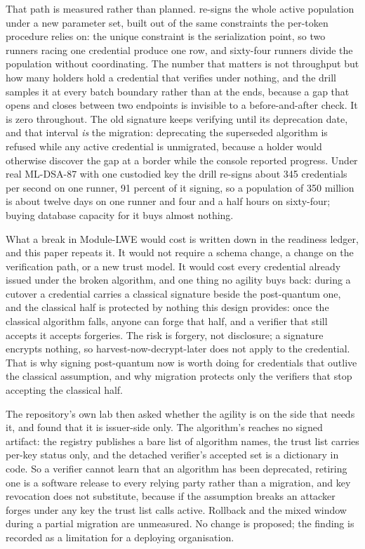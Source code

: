 That path is measured rather than planned.  re-signs the whole
active population under a new parameter set, built out of the same constraints the per-token
procedure relies on: the unique constraint is the serialization point, so two runners racing one
credential produce one row, and sixty-four runners divide the population without coordinating. The
number that matters is not throughput but how many holders hold a credential that verifies under
nothing, and the drill samples it at every batch boundary rather than at the ends, because a gap
that opens and closes between two endpoints is invisible to a before-and-after check. It is zero
throughout. The old signature keeps verifying until its deprecation date, and that interval
\emph{is} the migration: deprecating the superseded algorithm is refused while any active credential
is unmigrated, because a holder would otherwise discover the gap at a border while the console
reported progress. Under real ML-DSA-87 with one custodied key the drill re-signs about 345
credentials per second on one runner, 91 percent of it signing, so a population of 350 million is
about twelve days on one runner and four and a half hours on sixty-four; buying database capacity for
it buys almost nothing. \sImpl

What a break in Module-LWE would cost is written down in the readiness ledger, and this paper repeats
it. It would not require a schema change, a change on the verification path, or a new trust model.
It would cost every credential already issued under the broken algorithm, and one thing no agility
buys back: during a cutover a credential carries a classical signature beside the post-quantum one,
and the classical half is protected by nothing this design provides: once the classical algorithm
falls, anyone can forge that half, and a verifier that still accepts it accepts forgeries. The risk
is forgery, not disclosure; a signature encrypts nothing, so harvest-now-decrypt-later does not
apply to the credential. That is why signing post-quantum now is worth doing for credentials that
outlive the classical assumption, and why migration protects only the verifiers that stop accepting
the classical half.

The repository's own lab then asked whether the agility is on the side that needs it, and found that
it is issuer-side only. The algorithm's  reaches no signed artifact: the
registry publishes a bare list of algorithm names, the trust list carries per-key status only, and
the detached verifier's accepted set is a dictionary in code. So a verifier cannot learn that an
algorithm has been deprecated, retiring one is a software release to every relying party rather than
a migration, and key revocation does not substitute, because if the assumption breaks an attacker
forges under any key the trust list calls active. Rollback and the mixed window during a partial
migration are unmeasured. No change is proposed; the finding is recorded as a limitation for a
deploying organisation. \sExt

